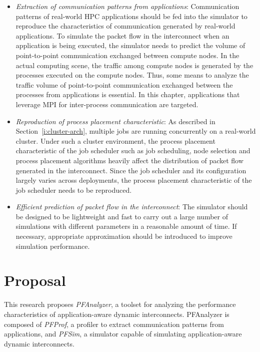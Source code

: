 \begin{itemize}
\item
  \emph{Extraction of communication patterns from applications}:
  Communication patterns of real-world HPC applications should be fed
  into the simulator to reproduce the characteristics of communication
  generated by real-world applications. To simulate the packet flow in
  the interconnect when an application is being executed, the simulator
  needs to predict the volume of point-to-point communication exchanged
  between compute nodes. In the actual computing scene, the traffic
  among compute nodes is generated by the processes executed on the
  compute nodes. Thus, some means to analyze the traffic volume of
  point-to-point communication exchanged between the processes from
  applications is essential. In this chapter, applications that leverage
  MPI for inter-process communication are targeted.
\item
  \emph{Reproduction of process placement characteristic}:
  As described in Section~\ref{i:cluster-arch}, multiple jobs are running
  concurrently on a real-world cluster. Under such a cluster environment, the
  process placement characteristic of the job scheduler such as job
  scheduling, node selection and process placement algorithms heavily affect
  the distribution of packet flow generated in the interconnect. Since the
  job scheduler and its configuration largely varies across deployments,
  the process placement characteristic of the job scheduler needs to be
  reproduced.
\item
  \emph{Efficient prediction of packet flow in the interconnect}:
  The simulator should be designed to be lightweight and fast
  to carry out a large number of simulations with different parameters in
  a reasonable amount of time. If necessary, appropriate approximation
  should be introduced to improve simulation performance.
\end{itemize}

\section{Proposal}\label{sec:ii-proposal}

This research proposes \emph{PFAnalyzer}, a toolset for analyzing the
performance characteristics of application-aware dynamic interconnects.
PFAnalyzer is composed of \emph{PFProf}, a profiler to extract communication
patterns from applications, and \emph{PFSim}, a simulator capable of
simulating application-aware dynamic interconnects.

